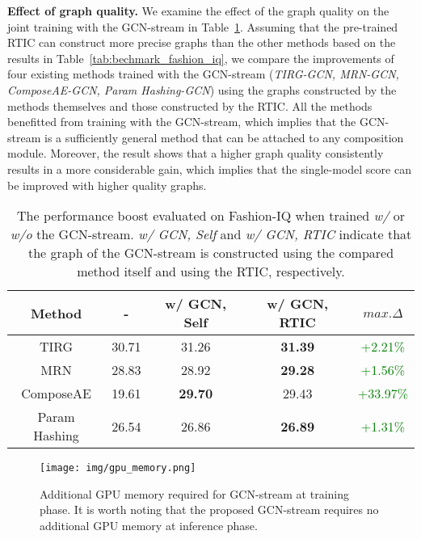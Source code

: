 \documentclass[10pt,twocolumn,letterpaper]{article}
\begin{document}
\noindent
\textbf{Effect of graph quality.} We examine the effect of the graph quality on the joint training with the GCN-stream in Table~\ref{tab:graph_quality}. Assuming that the pre-trained RTIC can construct more precise graphs than the other methods based on the results in Table~\ref{tab:bechmark_fashion_iq}, we compare the improvements of four existing methods trained with the GCN-stream (\textit{TIRG-GCN, MRN-GCN, ComposeAE-GCN, Param Hashing-GCN}) using the graphs constructed by the methods themselves and those constructed by the RTIC. All the methods benefitted from training with the GCN-stream, which implies that the GCN-stream is a sufficiently general method that can be attached to any composition module. Moreover, the result shows that a higher graph quality consistently results in a more considerable gain, which implies that the single-model score can be improved with higher quality graphs.

\begin{table}[h!]
    \caption{The performance boost evaluated on Fashion-IQ when trained \textit{w/} or \textit{w/o} the GCN-stream. \textit{w/ GCN, Self} and \textit{w/ GCN, RTIC} indicate that the graph of the GCN-stream is constructed using the compared method itself and using the RTIC, respectively.}
    \centering
    \begin{adjustbox}{width=0.48\textwidth}
    \begin{tabular}{cccc||c}
    \toprule
    Method          & -         & w/ GCN, Self   & w/ GCN, RTIC     & $\textit{max.}\Delta$         \\ \hline \hline
    TIRG            & 30.71     & 31.26          & \textbf{31.39}   & \textcolor{green}{+2.21\%}    \\
    MRN             & 28.83     & 28.92          & \textbf{29.28}   & \textcolor{green}{+1.56\%}    \\
    ComposeAE       & 19.61     & \textbf{29.70} & 29.43            & \textcolor{green}{+33.97\%}   \\
    Param Hashing   & 26.54     & 26.86          & \textbf{26.89}   & \textcolor{green}{+1.31\%}    \\
    \bottomrule
    \end{tabular}
    \end{adjustbox}
    \label{tab:graph_quality}
\end{table}

\begin{figure}[h]
    \begin{center}
	    \texttt{[image: img/gpu\_memory.png]}
	\end{center}
	\caption{Additional GPU memory required for GCN-stream at training phase. It is worth noting that the proposed GCN-stream requires no additional GPU memory at inference phase.}
	\label{fig:gpu_memory}
\end{figure}
\end{document}
